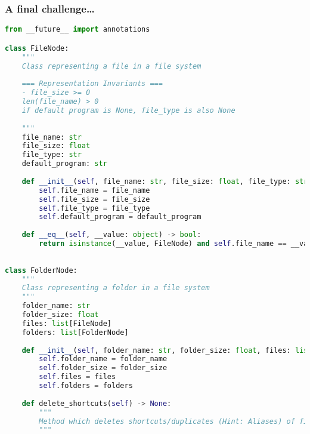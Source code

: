 \documentclass[hyperref={colorlinks,citecolor=blue,linkcolor=blue,urlcolor=blue}, aspectratio=1610]{beamer}
\begin{document}
\begin{frame}[fragile]
  \frametitle{A final challenge\ldots}
  \begin{lstlisting}[language=Python, style=mystyle]
from __future__ import annotations

class FileNode:
    """
    Class representing a file in a file system
    
    === Representation Invariants ===
    - file_size >= 0
    len(file_name) > 0
    if default program is None, file_type is also None 
    
    """
    file_name: str
    file_size: float
    file_type: str
    default_program: str
    
    def __init__(self, file_name: str, file_size: float, file_type: str = None, default_program: str = None):
        self.file_name = file_name
        self.file_size = file_size
        self.file_type = file_type
        self.default_program = default_program
    
    def __eq__(self, __value: object) -> bool:
        return isinstance(__value, FileNode) and self.file_name == __value.file_name and self.file_size == __value.file_size and self.file_type == __value.file_type and self.default_program == __value.default_program
    
  
class FolderNode:
    """
    Class representing a folder in a file system
    """
    folder_name: str
    folder_size: float
    files: list[FileNode]
    folders: list[FolderNode]
    
    def __init__(self, folder_name: str, folder_size: float, files: list[FileNode] = [], folders: list[FolderNode] = []):
        self.folder_name = folder_name
        self.folder_size = folder_size
        self.files = files
        self.folders = folders
    
    def delete_shortcuts(self) -> None:
        """
        Method which deletes shortcuts/duplicates (Hint: Aliases) of files in the folder recursively
        """    
    \end{lstlisting}    
\end{frame}
\end{document}
